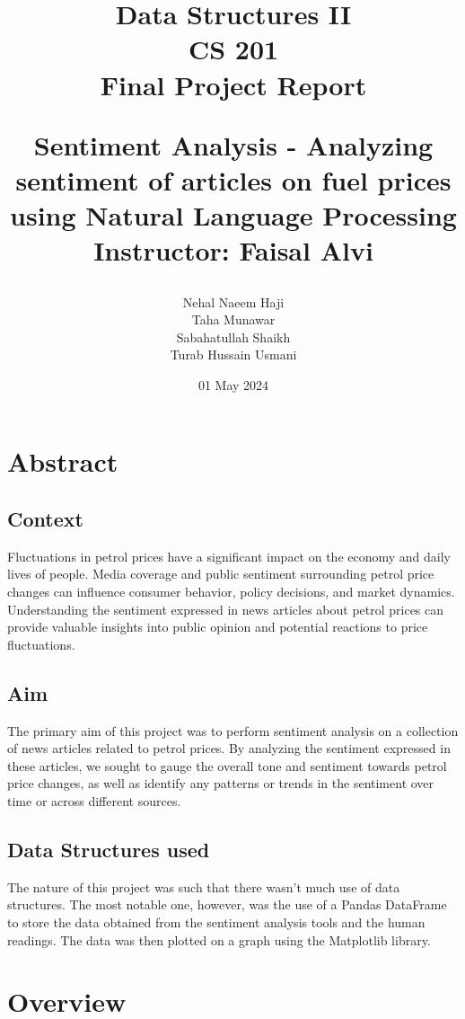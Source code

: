 \documentclass{report}
\title{{\huge \textbf{Data Structures II \\CS 201}} \\ 

\vspace*{5mm}
{\LARGE \textbf{Final Project Report}}

\vspace*{5mm}
{\Large \textbf{Sentiment Analysis - Analyzing sentiment of articles on fuel prices using Natural Language Processing}}\\
\vspace*{3mm}
{\Large \textbf{Instructor: Faisal Alvi}}}
\author{Nehal Naeem Haji\\Taha Munawar\\Sabahatullah Shaikh\\Turab Hussain Usmani}
\date{01 May 2024}
\begin{document}
\maketitle

\tableofcontents
\newpage

\chapter{Abstract}
\section{Context}
Fluctuations in petrol prices have a significant impact on the economy and daily lives of people. Media coverage and public sentiment surrounding petrol price changes can influence consumer behavior, policy decisions, and market dynamics. Understanding the sentiment expressed in news articles about petrol prices can provide valuable insights into public opinion and potential reactions to price fluctuations.

\section{Aim}
The primary aim of this project was to perform sentiment analysis on a collection of news articles related to petrol prices. By analyzing the sentiment expressed in these articles, we sought to gauge the overall tone and sentiment towards petrol price changes, as well as identify any patterns or trends in the sentiment over time or across different sources.

\section{Data Structures used}
The nature of this project was such that there wasn't much use of data structures. The most notable one, however, was the use of a Pandas DataFrame to store the data obtained from the sentiment analysis tools and the human readings. The data was then plotted on a graph using the Matplotlib library.

\chapter{Overview}
\end{document}
